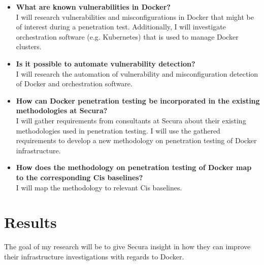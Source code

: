 \documentclass{article}
\begin{document}
\begin{itemize}
    \item \textbf{What are known vulnerabilities in Docker?}\\
    I will research vulnerabilities and misconfigurations in Docker that might be of interest during a penetration test. Additionally, I will investigate orchestration software (e.g. Kubernetes) that is used to manage Docker clusters.

    \item \textbf{Is it possible to automate vulnerability detection?}\\
    I will research the automation of vulnerability and misconfiguration detection of Docker and orchestration software.
    
    \item \textbf{How can Docker penetration testing be incorporated in the existing methodologies at Secura?}\\
    I will gather requirements from consultants at Secura about their existing methodologies used in penetration testing. I will use the gathered requirements to develop a new methodology on penetration testing of Docker infrastructure.
    
    \item \textbf{How does the methodology on penetration testing of Docker map to the corresponding Cis baselines?}\\
    I will map the methodology to relevant Cis baselines.
\end{itemize}

\section{Results}
The goal of my research will be to give Secura insight in how they can improve their infrastructure investigations with regards to Docker. 
\end{document}
